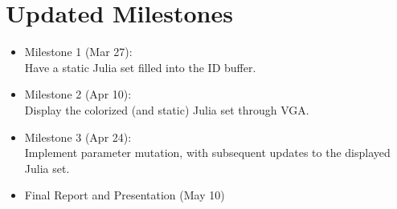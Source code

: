 \documentclass{article}
\begin{document}
\section{Updated Milestones}

\begin{itemize}
\item Milestone 1 (Mar 27): \\
  Have a static Julia set filled into the ID buffer.
\item Milestone 2 (Apr 10): \\
  Display the colorized (and static) Julia set through VGA.
\item Milestone 3 (Apr 24): \\ 
  Implement parameter mutation, with subsequent updates to the
  displayed Julia set.
\item Final Report and Presentation (May 10)
\end{itemize}
\end{document}
